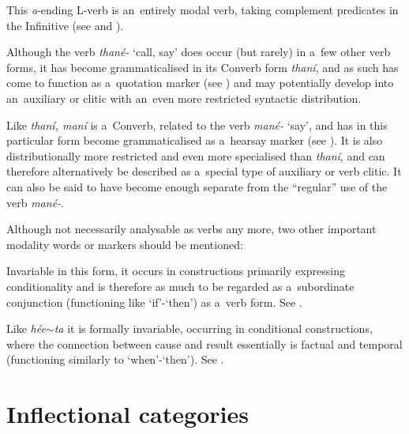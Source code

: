  This \textit{a}-ending L-verb is an~entirely modal verb, taking complement predicates in the Infinitive (see  and ).



 Although the verb \textit{thané-} `call, say' does occur (but rarely) in a~few other verb forms, it has become grammaticalised in its Converb form \textit{thaní}, and as such has come to function as a~quotation marker (see ) and may potentially develop into an~auxiliary or clitic with an~even more restricted syntactic distribution.



 Like \textit{thaní, maní} is a~Converb, related to the verb \textit{mané-} `say', and has in this particular form become grammaticalised as a~hearsay marker (see ). It is also distributionally more restricted and even more specialised than \textit{thaní}, and can therefore alternatively be described as a~special type of auxiliary or verb clitic. It can also be said to have become enough separate from the ``regular'' use of the verb \textit{mané-}.



Although not necessarily analysable as verbs any more, two other important modality words or markers should be mentioned:



 Invariable in this form, it occurs in constructions primarily expressing conditionality and is therefore as much to be regarded as a~subordinate conjunction (functioning like `if'-`then') as a~verb form. See .



 Like \textit{hée$\sim$ta} it is formally invariable, occurring in conditional constructions, where the connection between cause and result essentially is factual and temporal (functioning similarly to `when'-`then'). See .


\section{Inflectional categories}
\label{sec:8-4}

